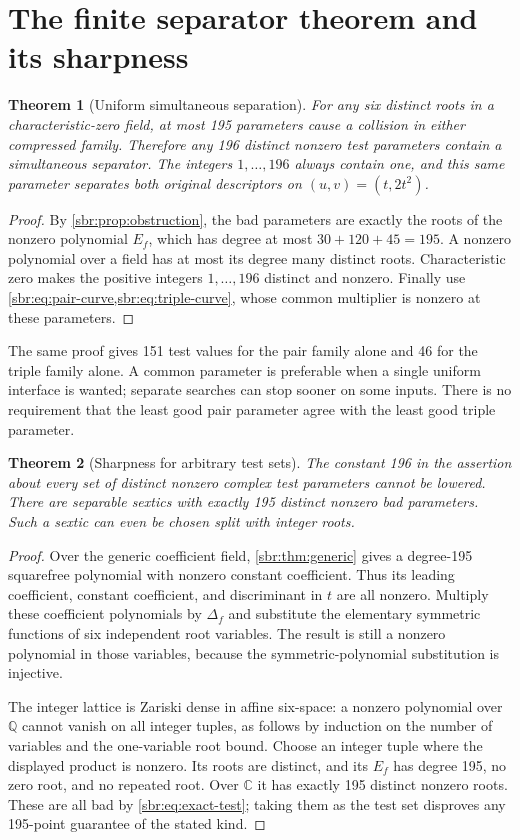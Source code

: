 \documentclass[11pt,letterpaper]{article}
\numberwithin{equation}{section}
\newtheorem{theorem}{Theorem}[section]
\theoremstyle{definition}
\theoremstyle{remark}
\newcommand{\QQ}{\mathbb Q}
\newcommand{\CC}{\mathbb C}
\begin{document}
\section{The finite separator theorem and its sharpness}
\label{sbr:sec:bound}

\begin{theorem}[Uniform simultaneous separation]
\label{sbr:thm:196}
For any six distinct roots in a characteristic-zero field, at most 195
parameters cause a collision in either compressed family. Therefore any
196 distinct nonzero test parameters contain a simultaneous separator.
The integers $1,\ldots,196$ always contain one, and this same parameter
separates both original descriptors on $(u,v)=(t,2t^2)$.
\end{theorem}
\begin{proof}
By \cref{sbr:prop:obstruction}, the bad parameters are exactly the roots of the
nonzero polynomial $E_f$, which has degree at most $30+120+45=195$.
A nonzero polynomial over a field has at most its degree many distinct
roots. Characteristic zero makes the positive integers $1,\ldots,196$
distinct and nonzero. Finally use \cref{sbr:eq:pair-curve,sbr:eq:triple-curve},
whose common multiplier is nonzero at these parameters.
\end{proof}

The same proof gives 151 test values for the pair family alone and 46 for
the triple family alone. A common parameter is preferable when a single
uniform interface is wanted; separate searches can stop sooner on some
inputs. There is no requirement that the least good pair parameter agree
with the least good triple parameter.

\begin{theorem}[Sharpness for arbitrary test sets]
\label{sbr:thm:sharp}
The constant 196 in the assertion about \emph{every} set of distinct
nonzero complex test parameters cannot be lowered. There are separable
sextics with exactly 195 distinct nonzero bad parameters. Such a sextic
can even be chosen split with integer roots.
\end{theorem}
\begin{proof}
Over the generic coefficient field, \cref{sbr:thm:generic} gives a degree-195
squarefree polynomial with nonzero constant coefficient. Thus its leading
coefficient, constant coefficient, and discriminant in $t$ are all nonzero.
Multiply these coefficient polynomials by $\Delta_f$ and substitute the
elementary symmetric functions of six independent root variables. The
result is still a nonzero polynomial in those variables, because the
symmetric-polynomial substitution is injective.

The integer lattice is Zariski dense in affine six-space: a nonzero
polynomial over $\QQ$ cannot vanish on all integer tuples, as follows by
induction on the number of variables and the one-variable root bound.
Choose an integer tuple where the displayed product is nonzero. Its roots
are distinct, and its $E_f$ has degree 195, no zero root, and no repeated
root. Over $\CC$ it has exactly 195 distinct nonzero roots. These are all
bad by \cref{sbr:eq:exact-test}; taking them as the test set disproves any
195-point guarantee of the stated kind.
\end{proof}
\end{document}
